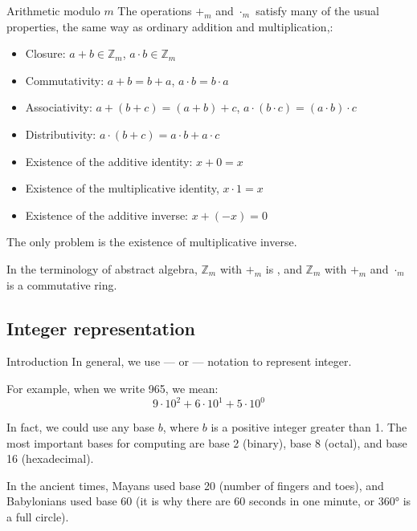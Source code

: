 \documentclass[a4paper]{article}
\begin{document}
\begin{parag}{Arithmetic modulo $m$}
    The operations $+_m$ and $\cdot_m$ satisfy many of the usual properties, the same way as ordinary addition and multiplication,:
    \begin{itemize}
        \item Closure: $a + b \in \mathbb{Z}_m$, $a\cdot b \in \mathbb{Z}_m$
        \item Commutativity: $a + b = b + a$, $a\cdot b = b\cdot a$
        \item Associativity: $a + \left(b + c\right) = \left(a + b\right) + c$, $a\cdot\left(b\cdot c\right) = \left(a\cdot b\right)\cdot c$
        \item Distributivity: $a\cdot\left(b + c\right) = a\cdot b + a\cdot c$
        \item Existence of the additive identity: $x + 0 = x$
        \item Existence of the multiplicative identity, $x\cdot 1 = x$
        \item Existence of the additive inverse: $x + \left(-x\right) = 0$
    \end{itemize}

    The only problem is the existence of multiplicative inverse. 

    In the terminology of abstract algebra, $\mathbb{Z}_m$ with $+_m$ is , and $\mathbb{Z}_m$ with $+_m$ and $\cdot_m$ is a commutative ring.
\end{parag}

\subsection{Integer representation}
\begin{parag}{Introduction}
    In general, we use  --- or  --- notation to represent integer.

    For example, when we write 965, we mean: 
    \[9\cdot 10^2 + 6\cdot 10^1 + 5\cdot 10^0\]

    In fact, we could use any base $b$, where $b$ is a positive integer greater than 1. The most important bases for computing are base 2 (binary), base 8 (octal), and base 16 (hexadecimal).

    In the ancient times, Mayans used base 20 (number of fingers and toes), and Babylonians used base 60 (it is why there are 60 seconds in one minute, or 360° is a full circle).
\end{parag}
\end{document}
